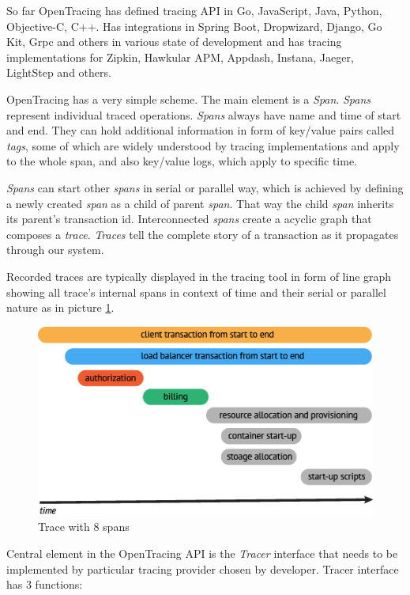 \documentclass[12pt,oneside]{fithesis2}
\begin{document}
So far OpenTracing has defined tracing API in Go, JavaScript, Java, Python, Objective-C, C++. Has integrations in Spring Boot, Dropwizard, Django, Go Kit, Grpc and others in various state of development and has tracing implementations for Zipkin, Hawkular APM, Appdash, Instana, Jaeger, LightStep and others.

OpenTracing has a very simple scheme. The main element is a \textit{Span}. \textit{Spans} represent individual traced operations. \textit{Spans} always have name and time of start and end. They can hold additional information in form of key/value pairs called \textit{tags}, some of which are widely understood by tracing implementations and apply to the whole span, and also key/value logs, which apply to specific time.

\textit{Spans} can start other \textit{spans} in serial or parallel way, which is achieved by defining a newly created \textit{span} as a child of parent \textit{span}. That way the child \textit{span} inherits its parent's transaction id. Interconnected \textit{spans} create a acyclic graph that composes a \textit{trace}. \textit{Traces} tell the complete story of a transaction as it propagates through our system.

Recorded traces are typically displayed in the tracing tool in form of line graph showing all trace's internal spans in context of time and their serial or parallel nature as in picture \ref{opentracing2}.

\begin{figure}[ht!]
	\label{opentracing2}
	\centering
	\includegraphics[width=\textwidth]{images/opentracing2.png}
	\caption{Trace with 8 spans \cite{opentracing}}
\end{figure}

Central element in the OpenTracing API is the \textit{Tracer} interface that needs to be implemented by particular tracing provider chosen by developer. Tracer interface has 3 functions:
\end{document}
